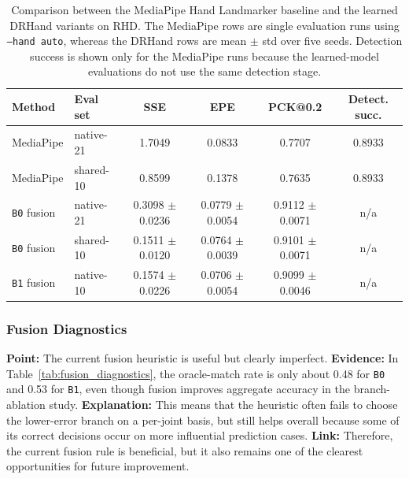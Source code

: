 \documentclass[10pt,letterpaper]{article}
\begin{document}
\begin{table}[t]
\centering
\footnotesize
\caption{Comparison between the MediaPipe Hand Landmarker baseline and the learned DRHand variants on RHD. The MediaPipe rows are single evaluation runs using \texttt{--hand auto}, whereas the DRHand rows are mean $\pm$ std over five seeds. Detection success is shown only for the MediaPipe runs because the learned-model evaluations do not use the same detection stage.}
\label{tab:mediapipe_baseline}
\begin{tabular}{llcccc}
\toprule
Method & Eval set & SSE & EPE & PCK@0.2 & Detect. succ. \\
\midrule
MediaPipe & native-21 & 1.7049 & 0.0833 & 0.7707 & 0.8933 \\
MediaPipe & shared-10 & 0.8599 & 0.1378 & 0.7635 & 0.8933 \\
\texttt{B0} fusion & native-21 & 0.3098 $\pm$ 0.0236 & 0.0779 $\pm$ 0.0054 & 0.9112 $\pm$ 0.0071 & n/a \\
\texttt{B0} fusion & shared-10 & 0.1511 $\pm$ 0.0120 & 0.0764 $\pm$ 0.0039 & 0.9101 $\pm$ 0.0071 & n/a \\
\texttt{B1} fusion & native-10 & 0.1574 $\pm$ 0.0226 & 0.0706 $\pm$ 0.0054 & 0.9099 $\pm$ 0.0046 & n/a \\
\bottomrule
\end{tabular}
\end{table}

\subsubsection{Fusion Diagnostics}

\medskip
\noindent\textbf{Point:} The current fusion heuristic is useful but clearly imperfect.  
\textbf{Evidence:} In Table~\ref{tab:fusion_diagnostics}, the oracle-match rate is only about 0.48 for \texttt{B0} and 0.53 for \texttt{B1}, even though fusion improves aggregate accuracy in the branch-ablation study.  
\textbf{Explanation:} This means that the heuristic often fails to choose the lower-error branch on a per-joint basis, but still helps overall because some of its correct decisions occur on more influential prediction cases.  
\textbf{Link:} Therefore, the current fusion rule is beneficial, but it also remains one of the clearest opportunities for future improvement.
\end{document}
